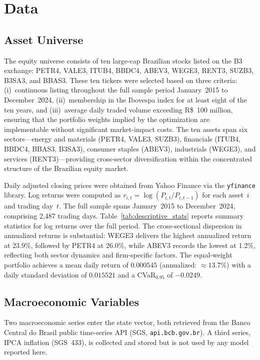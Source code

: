 \section{Data}
\label{sec:data}

\subsection{Asset Universe}
\label{subsec:data_assets}

The equity universe consists of ten large-cap Brazilian stocks listed on the B3
exchange: PETR4, VALE3, ITUB4, BBDC4, ABEV3, WEGE3, RENT3, SUZB3, B3SA3, and BBAS3.
These ten tickers were selected based on three criteria: (i)~continuous listing
throughout the full sample period January~2015 to December~2024, (ii)~membership in
the Ibovespa index for at least eight of the ten years, and (iii)~average daily
traded volume exceeding R\$~100 million, ensuring that the portfolio weights implied
by the optimization are implementable without significant market-impact costs.
The ten assets span six sectors---energy and materials (PETR4, VALE3, SUZB3),
financials (ITUB4, BBDC4, BBAS3, B3SA3), consumer staples (ABEV3), industrials
(WEGE3), and services (RENT3)---providing cross-sector diversification within the
concentrated structure of the Brazilian equity market.

Daily adjusted closing prices were obtained from Yahoo Finance via the
\texttt{yfinance} library.
Log returns were computed as $r_{i,t} = \log(P_{i,t}/P_{i,t-1})$ for each asset~$i$
and trading day~$t$.
The full sample spans January~2015 to December~2024, comprising 2,487 trading days.
Table~\ref{tab:descriptive_stats} reports summary statistics for log returns over
the full period.
The cross-sectional dispersion in annualized returns is substantial: WEGE3 delivers
the highest annualized return at 23.9\%, followed by PETR4 at 26.0\%, while ABEV3
records the lowest at 1.2\%, reflecting both sector dynamics and firm-specific factors.
The equal-weight portfolio achieves a mean daily return of $0.000545$ (annualized:
$\approx13.7\%$) with a daily standard deviation of $0.015521$ and a
CVaR$_{0.95}$ of $-0.0249$.

\subsection{Macroeconomic Variables}
\label{subsec:data_macro}

Two macroeconomic series enter the state vector, both retrieved from the Banco
Central do Brasil public time-series API (SGS, \texttt{api.bcb.gov.br}).
A third series, IPCA inflation (SGS~433), is collected and stored but is not used
by any model reported here.

